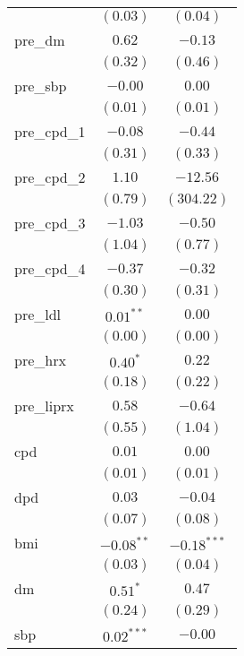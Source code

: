 \begin{tabular}{l c c}
                 & $(0.03)$       & $(0.04)$      \\
pre\_dm          & $0.62$         & $-0.13$       \\
                 & $(0.32)$       & $(0.46)$      \\
pre\_sbp         & $-0.00$        & $0.00$        \\
                 & $(0.01)$       & $(0.01)$      \\
pre\_cpd\_1      & $-0.08$        & $-0.44$       \\
                 & $(0.31)$       & $(0.33)$      \\
pre\_cpd\_2      & $1.10$         & $-12.56$      \\
                 & $(0.79)$       & $(304.22)$    \\
pre\_cpd\_3      & $-1.03$        & $-0.50$       \\
                 & $(1.04)$       & $(0.77)$      \\
pre\_cpd\_4      & $-0.37$        & $-0.32$       \\
                 & $(0.30)$       & $(0.31)$      \\
pre\_ldl         & $0.01^{**}$    & $0.00$        \\
                 & $(0.00)$       & $(0.00)$      \\
pre\_hrx         & $0.40^{*}$     & $0.22$        \\
                 & $(0.18)$       & $(0.22)$      \\
pre\_liprx       & $0.58$         & $-0.64$       \\
                 & $(0.55)$       & $(1.04)$      \\
cpd              & $0.01$         & $0.00$        \\
                 & $(0.01)$       & $(0.01)$      \\
dpd              & $0.03$         & $-0.04$       \\
                 & $(0.07)$       & $(0.08)$      \\
bmi              & $-0.08^{**}$   & $-0.18^{***}$ \\
                 & $(0.03)$       & $(0.04)$      \\
dm               & $0.51^{*}$     & $0.47$        \\
                 & $(0.24)$       & $(0.29)$      \\
sbp              & $0.02^{***}$   & $-0.00$       \\

\end{tabular}
